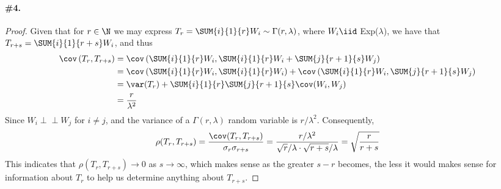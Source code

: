 \documentclass[12pt,titlepage]{article}
\newcommand{\orth}{\perp\!\!\!\perp}
\begin{document}
\paragraph{\#4.}
\begin{proof}
Given that for $r \in \N$ we may express $T_r = \SUM{i}{1}{r} W_i \sim \Gamma(r,\lambda)$, where $W_i \iid $ Exp($\lambda$), we have that $T_{r+s} = \SUM{i}{1}{r+s} W_i$, and thus
\begin{align*}
\cov\left(T_r, T_{r+s}\right) &= \cov\left( \SUM{i}{1}{r} W_i,  \SUM{i}{1}{r} W_i +  \SUM{j}{r+1}{s} W_j\right) \\
&= \cov\left( \SUM{i}{1}{r} W_i,  \SUM{i}{1}{r} W_i\right) + \cov\left( \SUM{i}{1}{r} W_i, \SUM{j}{r+1}{s} W_j\right) \\
&= \var(T_{r}) + \SUM{i}{1}{r}\SUM{j}{r+1}{s}\cov(W_i,W_j) \\
&= \frac{r}{\lambda^2}
\end{align*}
Since $W_i \orth W_j$ for $i \neq j$, and the variance of a $\Gamma(r,\lambda)$ random variable is $r/\lambda^2$. Consequently, 
\[
\rho(T_r, T_{r+s}) = \frac{\cov(T_r, T_{r+s})}{\sigma_{r} \sigma_{r+s}} = \frac{r/\lambda^2}{\sqrt{r}/\lambda \cdot \sqrt{r+s}/\lambda} = \sqrt{\frac{r}{r + s}}
\]
This indicates that $\rho(T_r, T_{r+s}) \to 0$ as $s \to \infty$, which makes sense as the greater $s-r$ becomes, the less it would makes sense for information about $T_r$ to help us determine anything about $T_{r+s}$. 
\end{proof}
\end{document}
